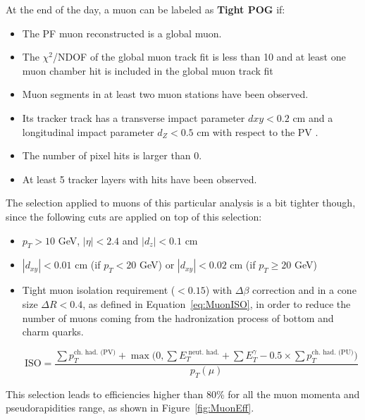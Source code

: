 \documentclass[a4paper, 10pt, openright]{report}
\begin{document}
At the end of the day, a muon can be labeled as \textbf{Tight \ac{POG}} if:
\begin{itemize}
\item The \ac{PF} muon reconstructed is a global muon.
\item The $\chi^2$/NDOF of the global muon track fit is less than 10 and at least one muon chamber hit is included in the global muon track fit%
\item Muon segments in at least two muon stations have been observed.
\item Its tracker track has a transverse impact parameter $dxy < 0.2$ cm and a longitudinal impact parameter $d_Z < 0.5$ cm with respect to the \ac{PV} .
\item The number of pixel hits is larger than 0.
\item At least 5 tracker layers with hits have been observed.
\end{itemize}

The selection applied to muons of this particular analysis is a bit tighter though, since the following cuts are applied on top of this selection:

\begin{itemize}
\item $p_T > 10$ GeV, $|\eta| < 2.4$ and $|d_z| < 0.1$ cm
\item $|d_{xy}| < 0.01$ cm (if $p_T < 20$ GeV) or $|d_{xy}| < 0.02$ cm (if $p_T \geq 20$ GeV)
\item Tight muon isolation requirement ($< 0.15$) with $\Delta \beta$ correction and in a cone size $\Delta R < 0.4$, as defined in Equation~\ref{eq:MuonISO}, in order to reduce the number of muons coming from the hadronization process of bottom and charm quarks.

\begin{equation}
\label{eq:MuonISO}
\text{ISO} = \frac{\sum p_T^{\text{ch. had. (PV)}} + \max \big (0, \sum E_T^{\text{ neut. had.}} + \sum E_T^{\gamma}  - 0.5 \times \sum p_T^\text{ch. had. (PU)} \big )}{p_T(\mu)}
\end{equation}

\end{itemize}

This selection leads to efficiencies higher than 80\% for all the muon momenta and pseudorapidities range, as shown in Figure~\ref{fig:MuonEff}.
\end{document}
